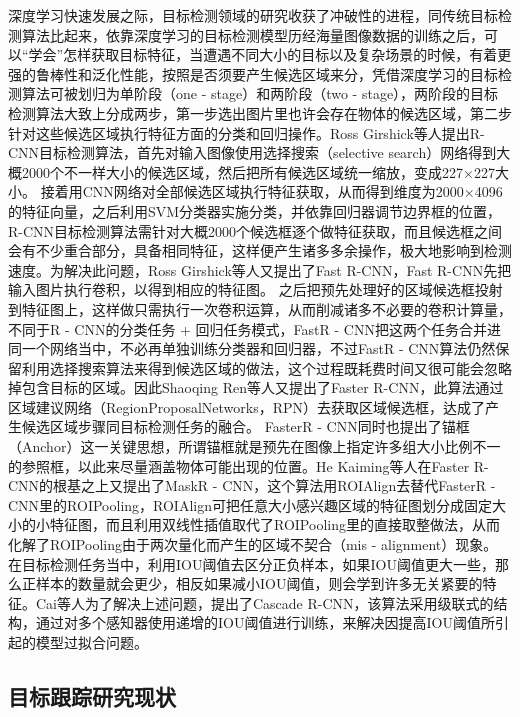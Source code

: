 深度学习快速发展之际，目标检测领域的研究收获了冲破性的进程，同传统目标检测算法比起来，依靠深度学习的目标检测模型历经海量图像数据的训练之后，可以“学会”怎样获取目标特征，当遭遇不同大小的目标以及复杂场景的时候，有着更强的鲁棒性和泛化性能，按照是否须要产生候选区域来分，凭借深度学习的目标检测算法可被划归为单阶段（one - stage）和两阶段（two - stage），两阶段的目标检测算法大致上分成两步，第一步选出图片里也许会存在物体的候选区域，第二步针对这些候选区域执行特征方面的分类和回归操作。Ross Girshick等人\cite{girshick2014rich}提出R-CNN目标检测算法，首先对输入图像使用选择搜索\cite{uijlings2013selective}（selective search）网络得到大概2000个不一样大小的候选区域，然后把所有候选区域统一缩放，变成227×227大小。 接着用CNN网络对全部候选区域执行特征获取，从而得到维度为2000×4096的特征向量，之后利用SVM分类器实施分类，并依靠回归器调节边界框的位置，R-CNN目标检测算法需针对大概2000个候选框逐个做特征获取，而且候选框之间会有不少重合部分，具备相同特征，这样便产生诸多多余操作，极大地影响到检测速度。为解决此问题，Ross Girshick等人\cite{girshick2015fast}又提出了Fast R-CNN，Fast R-CNN先把输入图片执行卷积，以得到相应的特征图。 之后把预先处理好的区域候选框投射到特征图上，这样做只需执行一次卷积运算，从而削减诸多不必要的卷积计算量，不同于R - CNN的分类任务 + 回归任务模式，FastR - CNN把这两个任务合并进同一个网络当中，不必再单独训练分类器和回归器，不过FastR - CNN算法仍然保留利用选择搜索算法来得到候选区域的做法，这个过程既耗费时间又很可能会忽略掉包含目标的区域。因此Shaoqing Ren等人\cite{ren2015faster}又提出了Faster R-CNN，此算法通过区域建议网络（RegionProposalNetworks，RPN）去获取区域候选框，达成了产生候选区域步骤同目标检测任务的融合。 FasterR - CNN同时也提出了锚框（Anchor）这一关键思想，所谓锚框就是预先在图像上指定许多组大小比例不一的参照框，以此来尽量涵盖物体可能出现的位置。He Kaiming\cite{he2017mask}等人在Faster R-CNN的根基之上又提出了MaskR - CNN，这个算法用ROIAlign去替代FasterR - CNN里的ROIPooling，ROIAlign可把任意大小感兴趣区域的特征图划分成固定大小的小特征图，而且利用双线性插值取代了ROIPooling里的直接取整做法，从而化解了ROIPooling由于两次量化而产生的区域不契合（mis - alignment）现象。 在目标检测任务当中，利用IOU阈值去区分正负样本，如果IOU阈值更大一些，那么正样本的数量就会更少，相反如果减小IOU阈值，则会学到许多无关紧要的特征。Cai等人\cite{cai2018cascade}为了解决上述问题，提出了Cascade R-CNN，该算法采用级联式的结构，通过对多个感知器使用递增的IOU阈值进行训练，来解决因提高IOU阈值所引起的模型过拟合问题。

\subsection{目标跟踪研究现状}


